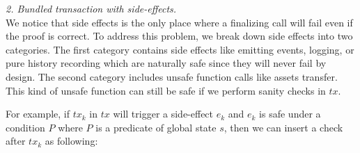 




\smallskip\noindent\emph{2. Bundled transaction with side-effects.}\\
We notice that side effects is the only place where a finalizing call will fail even if the proof is correct. To address this problem, we break down side effects into two categories. The first category contains side effects like emitting events, logging, or pure history recording which are naturally safe since they will never fail by design. The second category includes unsafe function calls like assets transfer. This kind of unsafe function can still be safe if we perform sanity checks in $tx$.

For example, if $tx_k$ in $tx$ will trigger a side-effect $e_k$ and $e_k$ is safe under a condition $P$ where $P$ is a predicate of global state $s$, then we can insert a check after $tx_k$ as following:

